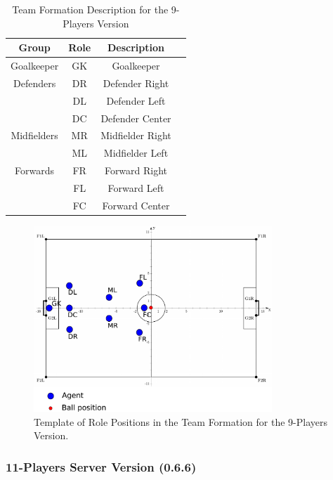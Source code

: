 \begin{table}[t!]
\caption{Team Formation Description for the 9-Players Version}
\label{TeamFormation9}
\begin{center}
    \begin{tabular}{cccc}
    \textbf{Group} 	 & \textbf{Role} & \textbf{Description}  \\
    \midrule
	Goalkeeper 		     & GK		& Goalkeeper  \\ 
    Defenders				& DR		& Defender Right			\\
     						& DL		& Defender Left		 	\\
    						& DC		& Defender Center			\\
    Midfielders 		    & MR		& Midfielder Right			\\
     						& ML		& Midfielder Left			\\
    Forwards  	    		& FR		& Forward Right		 	\\
     					& FL		& Forward Left		 	\\
     						& FC   	    & Forward Center		 
    \end{tabular}
\end{center}
\vspace*{-0.4cm}
\end{table}

\begin{figure}[b!]
\centering
  \includegraphics[width=0.8\textwidth]{Chapter4/figures/Formation9_0.pdf}
  \caption{Template of Role Positions in the Team Formation for the 9-Players Version.} 
  \label{fig:Formation9_0}
\end{figure}


\subsubsection*{11-Players Server Version (0.6.6)} 

